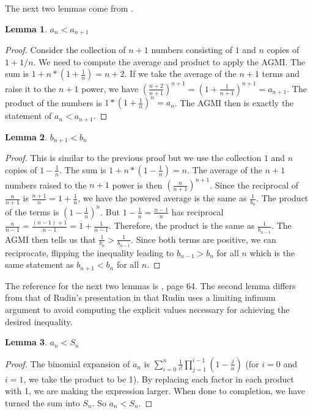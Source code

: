 \documentclass[12pt]{article}
\newtheorem{lemma}{Lemma}[subsection]
\begin{document}
The next two lemmas come from \cite{mend}.

\begin{lemma}
  $ a_n < a_{n+1}$ 
\end{lemma}

\begin{proof}
Consider the collection of $n+1$ numbers consisting of $1$ and $n$ copies of $1+1/n$. We need to compute the average and product to apply the AGMI. The sum is $1 + n* (1 + \frac{1}{n} ) = n+2$. If we take the average of the $n+1$ terms and raise it to the $n+1$ power, we have $(\frac{n+2}{n+1})^{n+1} = (1 + \frac{1}{n+1})^{n+1} = a_{n+1}$. The product of the numbers is $1*(1+\frac{1}{n})^n = a_n$. The AGMI then is exactly the statement of $a_n < a_{n+1}$.
\end{proof}

\begin{lemma}
 $b_{n+1} < b_n$
\end{lemma}

\begin{proof}
This is similar to the previous proof but we use the collection $1$ and $n$ copies of $1 - \frac{1}{n}$. The sum is $1 + n*(1-\frac{1}{n}) = n$. The average of the $n+1$ numbers raised to the $n+1$ power is then $(\frac{n}{n+1})^{n+1}$. Since the reciprocal of $\frac{n}{n+1}$ is $\frac{n+1}{n} = 1+\frac{1}{n}$, we have the powered average is the same as $\frac{1}{b_n}$. The product of the terms is $(1-\frac{1}{n})^n$. But $1 - \frac{1}{n} = \frac{n-1}{n}$ has reciprocal $\frac{n}{n-1} = \frac{ (n-1) + 1}{n-1} = 1 + \frac{1}{n-1}$. Therefore, the product is the same as $\frac{1}{b_{n-1}}$. The AGMI then tells us that $\frac{1}{b_n} > \frac{1}{b_{n-1}}$. Since both terms are positive, we can reciprocate, flipping the inequality leading to $b_{n-1} > b_n$ for all $n$ which is the same statement as $b_{n+1} < b_n$ for all $n$. 
\end{proof}

The reference for the next two lemmas is \cite{rudin}, page 64. The second lemma differs from that of Rudin's presentation in that Rudin uses a limiting infimum argument to avoid computing the explicit values necessary for achieving the desired inequality. 

\begin{lemma}\label{lem:ansn}
$a_n < S_n$
\end{lemma}

\begin{proof}
The binomial expansion of $a_n$ is $\sum_{i=0}^n \frac{1}{i!} \prod_{j=1}^{i-1} (1-\tfrac{j}{n})$ (for $i=0$ and $i=1$, we take the product to be 1). By replacing each factor in each product with 1, we are making the expression larger. When done to completion, we have turned the sum into $S_n$. So $a_n < S_n$.
\end{proof}
\end{document}
